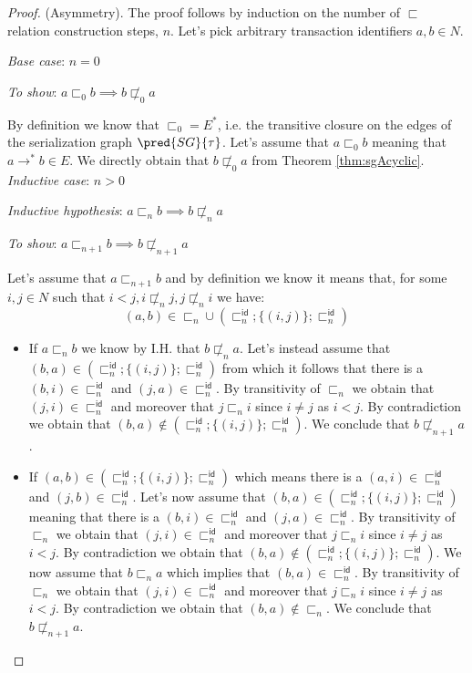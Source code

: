 \begin{proof}
(Asymmetry). The proof follows by induction on the number of $\sqsubset$ relation construction steps, $n$. Let's pick arbitrary transaction identifiers $a, b \in N$.

{\parindent0pt
\textit{Base case}: $n = 0$

\textit{To show}: $a \sqsubset_0 b \implies b \not\sqsubset_0 a$

By definition we know that $\sqsubset_0 = E^*$, i.e. the transitive closure on the edges of the serialization graph $\pred{SG}{\tau}$. Let's assume that $a \sqsubset_0 b$ meaning that $a \rightarrow^* b \in E$. We directly obtain that $b \not\sqsubset_0 a$ from Theorem \ref{thm:sgAcyclic}. \\

\textit{Inductive case}: $n > 0$

\textit{Inductive hypothesis}: $a \sqsubset_n b \implies b \not\sqsubset_n a$

\textit{To show}: $a \sqsubset_{n + 1} b \implies b \not\sqsubset_{n + 1} a$

Let's assume that $a \sqsubset_{n + 1} b$ and by definition we know it means that, for some $i, j \in N$ such that $i < j, i \not\sqsubset_n j, j \not\sqsubset_n i$ we have:
\[
	(a, b) \in \sqsubset_n \cup \left( \sqsubset_n^\mathsf{id} ; \{ (i, j) \} ; \sqsubset_n ^\mathsf{id} \right)
\]
\begin{itemize}
	\item If $a \sqsubset_n b$ we know by I.H. that $b \not\sqsubset_n a$. Let's instead assume that $(b, a) \in \left( \sqsubset_n^\mathsf{id} ; \{ (i, j) \} ; \sqsubset_n ^\mathsf{id} \right)$ from which it follows that there is a $(b, i) \in \sqsubset_n^\mathsf{id}$ and $(j, a) \in \sqsubset_n^\mathsf{id}$. By transitivity of $\sqsubset_n$ we obtain that $(j, i) \in \sqsubset_n^\mathsf{id}$ and moreover that $j \sqsubset_n i$ since $i \neq j$ as $i < j$. By contradiction we obtain that $(b, a) \not\in \left( \sqsubset_n^\mathsf{id} ; \{ (i, j) \} ; \sqsubset_n ^\mathsf{id} \right)$. We conclude that $b \not\sqsubset_{n + 1} a$.
	\item If $(a, b) \in \left( \sqsubset_n^\mathsf{id} ; \{ (i, j) \} ; \sqsubset_n ^\mathsf{id} \right)$ which means there is a $(a, i) \in \sqsubset_n^\mathsf{id}$ and $(j, b) \in \sqsubset_n^\mathsf{id}$. Let's now assume that $(b, a) \in \left( \sqsubset_n^\mathsf{id} ; \{ (i, j) \} ; \sqsubset_n ^\mathsf{id} \right)$ meaning that there is a $(b, i) \in \sqsubset_n^\mathsf{id}$ and $(j, a) \in \sqsubset_n^\mathsf{id}$. By transitivity of $\sqsubset_n$ we obtain that $(j, i) \in \sqsubset_n^\mathsf{id}$ and moreover that $j \sqsubset_n i$ since $i \neq j$ as $i < j$. By contradiction we obtain that $(b, a) \not\in \left( \sqsubset_n^\mathsf{id} ; \{ (i, j) \} ; \sqsubset_n ^\mathsf{id} \right)$. We now assume that $b \sqsubset_n a$ which implies that $(b, a) \in \sqsubset_n^\mathsf{id}$. By transitivity of $\sqsubset_n$ we obtain that $(j, i) \in \sqsubset_n^\mathsf{id}$ and moreover that $j \sqsubset_n i$ since $i \neq j$ as $i < j$. By contradiction we obtain that $(b, a) \not\in \sqsubset_n$. We conclude that $b \not\sqsubset_{n + 1} a$.
\end{itemize}
}


\end{proof}
